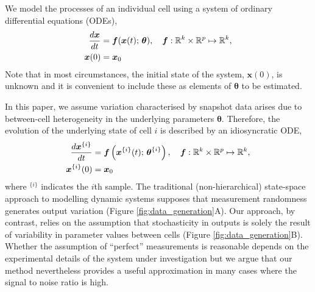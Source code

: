 We model the processes of an individual cell using a system of ordinary differential equations (ODEs), %
%
\begin{equation}\label{eq:ode}
\begin{aligned}
\frac{d\boldsymbol{x}}{dt} &= \boldsymbol{f}(\boldsymbol{x}(t); \, \boldsymbol{\theta}), \quad \boldsymbol{f}: \mathbb{R}^k \times \mathbb{R}^p \mapsto \mathbb{R}^k, \\
\boldsymbol{x}(0) &= \boldsymbol{x}_0
\end{aligned}
\end{equation}
%
Note that in most circumstances, the initial state of the system, $\boldsymbol{x}(0)$, is unknown and it is convenient to include these as elements of $\boldsymbol{\theta}$ to be estimated. %

In this paper, we assume variation characterised by snapshot data arises due to between-cell heterogeneity in the underlying parameters $\boldsymbol{\theta}$. Therefore, the evolution of the underlying state of cell $i$ is described by an idiosyncratic ODE,
%
\begin{equation} \label{eq:ode_i}
\begin{aligned}
\frac{d\boldsymbol{x}^{\{i\}}}{dt} &= \boldsymbol{f} \left( \boldsymbol{x}^{\{i\}}(t); \, \boldsymbol{\theta}^{\{i\}} \right),
                                      \quad \boldsymbol{f}: \mathbb{R}^k \times \mathbb{R}^p \mapsto \mathbb{R}^k, \\
\boldsymbol{x}^{\{i\}}(0) &= \boldsymbol{x}_0
\end{aligned}
\end{equation}
where $^{\{i\}}$ indicates the $i$th sample.
%
The traditional (non-hierarchical) state-space approach to modelling dynamic systems supposes that measurement randomness generates output variation (Figure \ref{fig:data_generation}A). Our approach, by contrast, relies on the assumption that stochasticity in outputs is solely the result of variability in parameter values between cells (Figure \ref{fig:data_generation}B). Whether the assumption of ``perfect'' measurements is reasonable depends on the experimental details of  the system under investigation but we argue that our method nevertheless provides a useful approximation in many cases where the signal to noise ratio is high.

